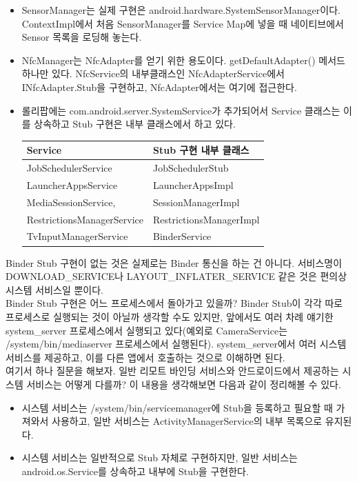 \begin{itemize}
\item SensorManager는 실제 구현은 android.hardware.SystemSensorManager이다. ContextImpl에서 처음 SensorManager를 Service Map에 넣을 때 네이티브에서 Sensor 목록을 로딩해 놓는다.
\item NfcManager는 NfcAdapter를 얻기 위한 용도이다.  getDefaultAdapter() 메서드 하나만 있다. NfcService의 내부클래스인 NfcAdapterService에서 INfcAdapter.Stub을 구현하고, NfcAdapter에서는 여기에 접근한다.
\item 롤리팝에는 com.android.server.SystemService가 추가되어서 Service 클래스는 이를 상속하고 Stub 구현은 내부 클래스에서 하고 있다.\\
\begin{tabular}[fontsize=\tiny]{|l|l|} \hline
Service & Stub 구현 내부 클래스 \\ \hline
JobSchedulerService & JobSchedulerStub \\ \hline
LauncherAppsService & LauncherAppsImpl \\ \hline
MediaSessionService, & SessionManagerImpl \\ \hline
RestrictionsManagerService & RestrictionsManagerImpl \\ \hline
TvInputManagerService & BinderService \\ \hline
\end{tabular}
\end{itemize}

Binder Stub 구현이 없는 것은 실제로는 Binder 통신을 하는 건 아니다.
서비스명이 DOWNLOAD\_SERVICE나 LAYOUT\_INFLATER\_SERVICE 같은 것은 편의상 시스템 서비스일 뿐이다.\\

Binder Stub 구현은 어느 프로세스에서 돌아가고 있을까? Binder Stub이 각각 따로 프로세스로 실행되는 것이 아닐까 생각할 수도 있지만, 앞에서도 여러 차례 얘기한 system\_server 프로세스에서 실행되고 있다(예외로 CameraService는 /system/bin/mediaserver 프로세스에서 실행된다).			
system\_server에서 여러 시스템 서비스를 제공하고, 이를 다른 앱에서 호출하는 것으로 이해하면 된다.\\

여기서 하나 질문을 해보자. 일반 리모트 바인딩 서비스와 안드로이드에서 제공하는 시스템 서비스는 어떻게 다를까?
이 내용을 생각해보면 다음과 같이 정리해볼 수 있다.
\begin{itemize}
\item 시스템 서비스는 /system/bin/servicemanager에 Stub을 등록하고 필요할 때 가져와서 사용하고, 일반 서비스는 ActivityManagerService의 내부 목록으로 유지된다.
\item 시스템 서비스는 일반적으로 Stub 자체로 구현하지만, 일반 서비스는 android.os.Service를 상속하고 내부에 Stub을 구현한다.
\end{itemize}

